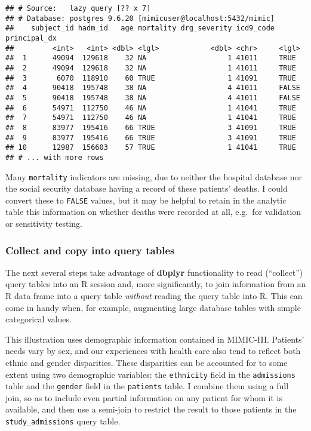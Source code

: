 \documentclass[
]{article}
\begin{document}
\begin{verbatim}
## # Source:   lazy query [?? x 7]
## # Database: postgres 9.6.20 [mimicuser@localhost:5432/mimic]
##    subject_id hadm_id   age mortality drg_severity icd9_code principal_dx
##         <int>   <int> <dbl> <lgl>            <dbl> <chr>     <lgl>       
##  1      49094  129618    32 NA                   1 41011     TRUE        
##  2      49094  129618    32 NA                   1 41011     TRUE        
##  3       6070  118910    60 TRUE                 1 41091     TRUE        
##  4      90418  195748    38 NA                   4 41011     FALSE       
##  5      90418  195748    38 NA                   4 41011     FALSE       
##  6      54971  112750    46 NA                   1 41041     TRUE        
##  7      54971  112750    46 NA                   1 41041     TRUE        
##  8      83977  195416    66 TRUE                 3 41091     TRUE        
##  9      83977  195416    66 TRUE                 3 41091     TRUE        
## 10      12987  156603    57 TRUE                 1 41041     TRUE        
## # ... with more rows
\end{verbatim}

Many \texttt{mortality} indicators are missing, due to neither the
hospital database nor the social security database having a record of
these patients' deaths. I could convert these to \texttt{FALSE} values,
but it may be helpful to retain in the analytic table this information
on whether deaths were recorded at all, e.g.~for validation or
sensitivity testing.

\hypertarget{collect-and-copy-into-query-tables}{%
\subsubsection{Collect and copy into query
tables}\label{collect-and-copy-into-query-tables}}

The next several steps take advantage of \textbf{dbplyr} functionality
to read (``collect'') query tables into an R session and, more
significantly, to join information from an R data frame into a query
table \emph{without} reading the query table into R. This can come in
handy when, for example, augmenting large database tables with simple
categorical values.

This illustration uses demographic information contained in MIMIC-III.
Patients' needs vary by sex, and our experiences with health care also
tend to reflect both ethnic and gender disparities. These disparities
can be accounted for to some extent using two demographic variables: the
\texttt{ethnicity} field in the \texttt{admissions} table and the
\texttt{gender} field in the \texttt{patients} table. I combine them
using a full join, so as to include even partial information on any
patient for whom it is available, and then use a semi-join to restrict
the result to those patients in the \texttt{study\_admissions} query
table.
\end{document}
